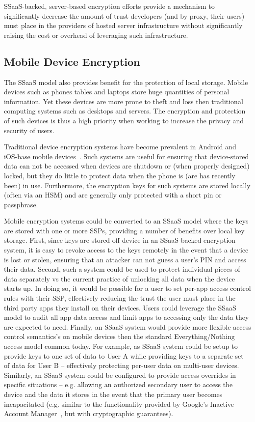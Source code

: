 SSaaS-backed, server-based encryption efforts provide a mechanism to
significantly decrease the amount of trust developers (and by proxy,
their users) must place in the providers of hosted server
infrastructure without significantly raising the cost or overhead of
leveraging such infrastructure.

\subsection{Mobile Device Encryption}

The SSaaS model also provides benefit for the protection of local
storage. Mobile devices such as phones tables and laptops
store huge quantities of personal information. Yet these devices are
more prone to theft and loss then traditional computing systems such
as desktops and servers. The encryption and protection of such devices
is thus a high priority when working to increase the privacy and
security of users.

Traditional device encryption systems have become prevalent in Android
and iOS-base mobile devices~\cite{ars-android-encrypt,
  ars-ios-encrypt}. Such systems are useful for ensuring that
device-stored data can not be accessed when devices are shutdown or
(when properly designed) locked, but they do little to protect data
when the phone is (are has recently been) in use. Furthermore, the
encryption keys for such systems are stored locally (often via an HSM)
and are generally only protected with a short pin or passphrase.

Mobile encryption systems could be converted to an SSaaS model where
the keys are stored with one or more SSPs, providing a number of
benefits over local key storage. First, since keys are stored
off-device in an SSaaS-backed encryption system, it is easy to revoke
access to the keys remotely in the event that a device is lost or
stolen, ensuring that an attacker can not guess a user's PIN and
access their data. Second, such a system could be used to protect
individual pieces of data separately vs the current practice of
unlocking all data when the device starts up. In doing so, it would be
possible for a user to set per-app access control rules with their
SSP, effectively reducing the trust the user must place in the third
party apps they install on their devices. Users could leverage the
SSaaS model to audit all app data access and limit apps to accessing
only the data they are expected to need. Finally, an SSaaS system
would provide more flexible access control semantics's on mobile
devices then the standard Everything/Nothing access model common
today. For example, as SSaaS system could be setup to provide keys to
one set of data to User A while providing keys to a separate set of
data for User B -- effectively protecting per-user data on multi-user
devices. Similarly, an SSaaS system could be configured to provide
access overrides in specific situations -- e.g. allowing an authorized
secondary user to access the device and the data it stores in the
event that the primary user becomes incapacitated (e.g. similar to the
functionality provided by Google's Inactive Account
Manager~\cite{atlantic-google-iam}, but with cryptographic
guarantees).

